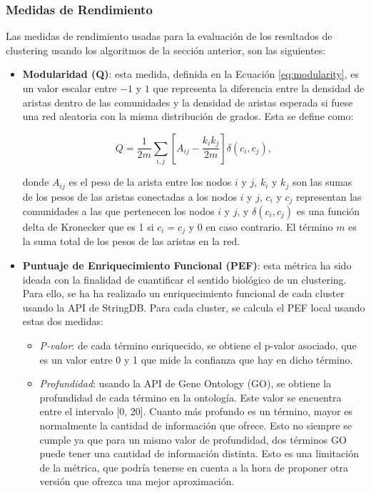 \subsubsection{Medidas de Rendimiento}
\label{sec:metricas}

Las medidas de rendimiento usadas para la evaluación de los resultados de clustering usando los algoritmos de la sección anterior, son las siguientes:

\begin{itemize}
    \item \textbf{Modularidad (Q)}: esta medida, definida en la Ecuación \ref{eq:modularity}, es un valor escalar entre \(-1\) y \(1\) que representa la diferencia entre la densidad de aristas dentro de las comunidades y la densidad de aristas esperada si fuese una red aleatoria con la misma distribución de grados. Esta se define como:

    \begin{equation}
    \label{eq:modularity}
    Q = \frac{1}{2m} \sum_{i,j} \left[ A_{ij} - \frac{k_i k_j}{2m} \right] \delta(c_i, c_j),
    \end{equation}

    \noindent donde \( A_{ij} \) es el peso de la arista entre los nodos \( i \) y \( j \), \( k_i \) y \( k_j \) son las sumas de los pesos de las aristas conectadas a los nodos \( i \) y \( j \), \( c_i \) y \( c_j \) representan las comunidades a las que pertenecen los nodos \( i \) y \( j \), y \( \delta(c_i, c_j) \) es una función delta de Kronecker que es 1 si \( c_i = c_j \) y 0 en caso contrario. El término \( m \) es la suma total de los pesos de las aristas en la red.

    \item \textbf{Puntuaje de Enriquecimiento Funcional (PEF)}: esta métrica ha sido ideada con la finalidad de cuantificar el sentido biológico de un clustering. Para ello, se ha ha realizado un enriquecimiento funcional de cada cluster usando la API de StringDB. Para cada cluster, se calcula el PEF local usando estas dos medidas:

    \begin{itemize}
        \item \textit{P-valor}: de cada término enriquecido, se obtiene el p-valor asociado, que es un valor entre 0 y 1 que mide la confianza que hay en dicho término.

        \item \textit{Profundidad}: usando la API de Gene Ontology (GO), se obtiene la profundidad de cada término en la ontología. Este valor se encuentra entre el intervalo [0, 20]. Cuanto más profundo es un término, mayor es normalmente la cantidad de información que ofrece. Esto no siempre se cumple ya que para un mismo valor de profundidad, dos términos GO puede tener una cantidad de información distinta. Esto es una limitación de la métrica, que podría tenerse en cuenta a la hora de proponer otra versión que ofrezca una mejor aproximación.
    \end{itemize}


\end{itemize}
